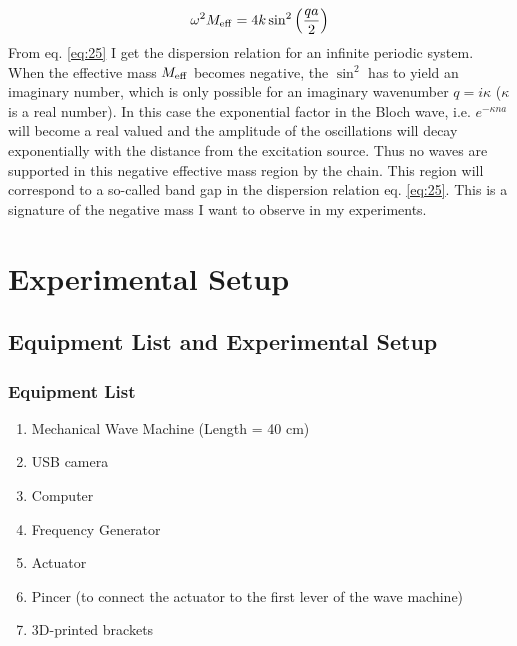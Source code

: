 \documentclass[12pt]{article}
\begin{document}
\begin{equation}\label{eq:25}
	\omega^2 M_{\rm eff} = 4k\sin^2\left(\frac{qa}{2} \right)
\end{equation}
From eq. \ref{eq:25} I get the dispersion relation for an infinite periodic system. When the effective mass $M_{\rm eff}$ becomes negative, the $\sin^{2}$ has to yield an imaginary number, which is only possible for an imaginary wavenumber $q=i\kappa$ ($\kappa$ is a real number). In this case the exponential factor in the Bloch wave, i.e. $e^{-\kappa n a}$ will become a real valued and the amplitude of the oscillations will decay exponentially with the distance from the excitation source. Thus no waves are supported in this negative effective mass region by the chain. This region will correspond to a so-called band gap in the dispersion relation eq. \ref{eq:25}. This is a signature of the negative mass I want to observe in my experiments.

\section{Experimental Setup}
\subsection{Equipment List and Experimental Setup}
\subsubsection{Equipment List}
\begin{enumerate}
	\item Mechanical Wave Machine (Length = 40 cm)
	\item USB camera
	\item Computer
	\item Frequency Generator
	\item Actuator
	\item Pincer (to connect the actuator to the first lever of the wave machine)
	\item 3D-printed brackets 
\end{enumerate}
\end{document}
